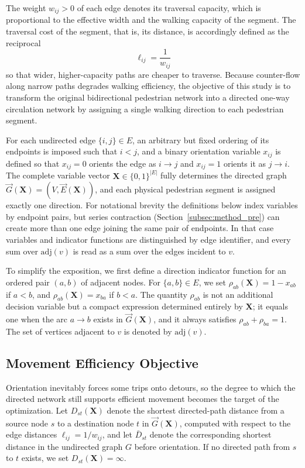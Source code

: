 \documentclass[twocolumn,a4paper]{article}
\begin{document}
The weight \(w_{ij}>0\) of each edge denotes its traversal capacity, which is proportional to the effective width and the walking capacity of the segment. The traversal cost of the segment, that is, its distance, is accordingly defined as the reciprocal
\begin{equation}
    \ell_{ij}=\frac{1}{w_{ij}}
\end{equation}
so that wider, higher-capacity paths are cheaper to traverse. Because counter-flow along narrow paths degrades walking efficiency, the objective of this study is to transform the original bidirectional pedestrian network into a directed one-way circulation network by assigning a single walking direction to each pedestrian segment.

For each undirected edge \(\{i,j\}\in E\), an arbitrary but fixed ordering of its endpoints is imposed such that \(i<j\), and a binary orientation variable \(x_{ij}\) is defined so that \(x_{ij}=0\) orients the edge as \(i\rightarrow j\) and \(x_{ij}=1\) orients it as \(j\rightarrow i\). The complete variable vector \(\mathbf{X}\in\{0,1\}^{|E|}\) fully determines the directed graph \(\vec{G}(\mathbf{X})=(V,\vec{E}(\mathbf{X}))\), and each physical pedestrian segment is assigned exactly one direction. For notational brevity the definitions below index variables by endpoint pairs, but series contraction (Section~\ref{subsec:method_pre}) can create more than one edge joining the same pair of endpoints. In that case variables and indicator functions are distinguished by edge identifier, and every sum over \(\mathrm{adj}(v)\) is read as a sum over the edges incident to \(v\).

To simplify the exposition, we first define a direction indicator function for an ordered pair \((a,b)\) of adjacent nodes. For \(\{a,b\}\in E\), we set \(\rho_{ab}(\mathbf{X})=1-x_{ab}\) if \(a<b\), and \(\rho_{ab}(\mathbf{X})=x_{ba}\) if \(b<a\). The quantity \(\rho_{ab}\) is not an additional decision variable but a compact expression determined entirely by \(\mathbf{X}\); it equals one when the arc \(a\rightarrow b\) exists in \(\vec{G}(\mathbf{X})\), and it always satisfies \(\rho_{ab}+\rho_{ba}=1\). The set of vertices adjacent to \(v\) is denoted by \(\mathrm{adj}(v)\).

\subsection{Movement Efficiency Objective}

Orientation inevitably forces some trips onto detours, so the degree to which the directed network still supports efficient movement becomes the target of the optimization. Let \(D_{st}(\mathbf{X})\) denote the shortest directed-path distance from a source node \(s\) to a destination node \(t\) in \(\vec{G}(\mathbf{X})\), computed with respect to the edge distances \(\ell_{ij}=1/w_{ij}\), and let \(\bar{D}_{st}\) denote the corresponding shortest distance in the undirected graph \(G\) before orientation. If no directed path from \(s\) to \(t\) exists, we set \(D_{st}(\mathbf{X})=\infty\).
\end{document}
